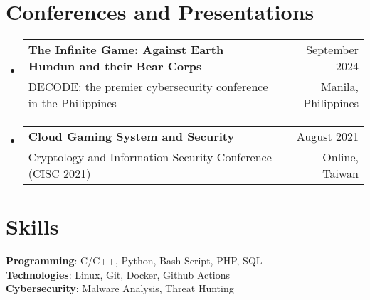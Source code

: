 \documentclass[A4,11pt]{article}
\makeatletter
\newcommand{\CVSubheading}[4]{
  \vspace{-2pt}\item
    \begin{tabular*}{0.97\textwidth}[t]{l@{\extracolsep{\fill}}r}
      \textbf{#1} & #2 \\
      \small#3 & \small #4 \\
    \end{tabular*}\vspace{-7pt}
}
\newcommand{\CVSubHeadingListStart}{\begin{itemize}[leftmargin=0.5cm, label={}]}
\newcommand{\CVSubHeadingListEnd}{\end{itemize}}
\makeatother
\begin{document}
\section{Conferences and Presentations}
  \CVSubHeadingListStart
    \CVSubheading
      {The Infinite Game: Against Earth Hundun and their Bear Corps}{September 2024}
      {DECODE: the premier cybersecurity conference in the Philippines}{Manila, Philippines}
    \CVSubheading
      {Cloud Gaming System and Security}{August 2021}
      {Cryptology and Information Security Conference (CISC 2021)}{Online, Taiwan}
  \CVSubHeadingListEnd

\begin{comment}
This section is compressed from the various skills sections that Euro CV
recommends.
\end{comment}

\section{Skills}
 \begin{itemize}[leftmargin=0.5cm, label={}]
    \small{\item{
      \textbf{Programming}{: C/C++, Python, Bash Script, PHP, SQL} \\
      \textbf{Technologies}{: Linux, Git, Docker, Github Actions} \\
      \textbf{Cybersecurity}{: Malware Analysis, Threat Hunting} \\
    }}
 \end{itemize}
    
\end{document}
